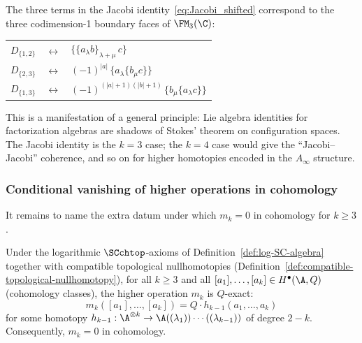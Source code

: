 \begin{remark}
The three terms in the Jacobi identity~\eqref{eq:Jacobi_shifted} correspond to the three codimension-1 boundary faces of $\FM_3(\C)$:
\begin{center}
\begin{tabular}{lcl}
$D_{\{1,2\}}$ & $\longleftrightarrow$ & $\{\{a_\lambda b\}_{\lambda+\mu}\, c\}$ \\
$D_{\{2,3\}}$ & $\longleftrightarrow$ & $(-1)^{|a|}\,\{a_\lambda \{b_\mu c\}\}$ \\
$D_{\{1,3\}}$ & $\longleftrightarrow$ & $(-1)^{(|a|+1)(|b|+1)}\,\{b_\mu \{a_\lambda c\}\}$
\end{tabular}
\end{center}
This is a manifestation of a general principle: Lie algebra identities for factorization algebras are shadows of Stokes' theorem on configuration spaces. The Jacobi identity is the $k=3$ case; the $k=4$ case would give the ``Jacobi--Jacobi'' coherence, and so on for higher homotopies encoded in the $A_\infty$ structure.
\end{remark}

\subsubsection{Conditional vanishing of higher operations in cohomology}

It remains to name the extra datum under which $m_k = 0$ in
cohomology for $k \geq 3$.

\begin{theorem}
Under the logarithmic $\SCchtop$-axioms of
Definition~\ref{def:log-SC-algebra} together with compatible topological
nullhomotopies (Definition~\ref{def:compatible-topological-nullhomotopy}),
for all $k \geq 3$ and all $[a_1], \ldots, [a_k] \in H^\bullet(\A, Q)$
(cohomology classes), the higher operation $m_k$ is $Q$-exact:
\[
m_k([a_1], \ldots, [a_k]) = Q \cdot h_{k-1}(a_1, \ldots, a_k)
\]
for some homotopy $h_{k-1} : \A^{\otimes k} \to \A((\lambda_1)) \cdots ((\lambda_{k-1}))$ of degree $2-k$. Consequently, $m_k = 0$ in cohomology.
\end{theorem}

